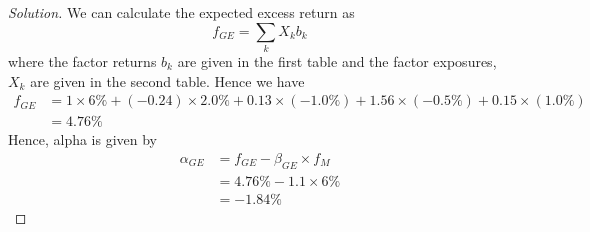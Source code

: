 \begin{proof}[Solution]
  We can calculate the expected excess return as
  \begin{equation*}
   f_{GE} = \sum_{k}X_{k}b_{k}
  \end{equation*}
  where the factor returns $b_{k}$ are given in the first table and the factor exposures, $X_{k}$ are given in the second table. Hence we have
  \begin{align*}
   f_{GE} &= 1\times 6\% +(-0.24)\times2.0\% + 0.13\times(-1.0\%) +1.56\times(-0.5\%) + 0.15\times(1.0\%)\\
	  &=4.76\%
  \end{align*}
  Hence, alpha is given by
  \begin{align*}
   \alpha_{GE}&=f_{GE} -\beta_{GE}\times f_{M}\\
	      &=4.76\% - 1.1\times6\%\\
	      &=-1.84\%
  \end{align*}


\end{proof}
